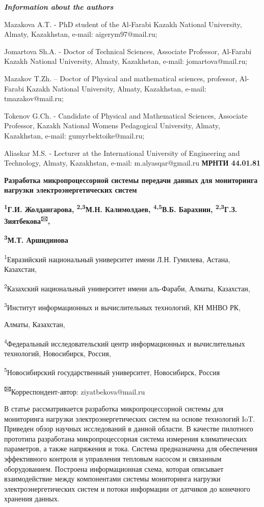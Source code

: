 \emph{{\bfseries Information about the authors}}

Mazakova A.T. - PhD student of the Al-Farabi Kazakh National University,
Almaty, Kazakhstan, e-mail: aigerym97@mail.ru;

Jomartova Sh.A. - Doctor of Technical Sciences, Associate Professor,
Al-Farabi Kazakh National University, Almaty, Kazakhstan, e-mail:
jomartova@mail.ru;

Mazakov T.Zh. -- Doctor of Physical and mathematical sciences,
professor, Al-Farabi Kazakh National University, Almaty, Kazakhstan,
e-mail: tmazakov@mail.ru;

Tokenov G.Ch. - Candidate of Physical and Mathematical Sciences,
Associate Professor, Kazakh National Women\textquotesingle s Pedagogical
University, Almaty, Kazakhstan, e-mail: gumyrbektoike@mail.ru;

Aliaskar M.S. - Lecturer at the International University of Engineering
and Technology, Almaty, Kazakhstan, e-mail: m.alyasqar@gmail.ru\newpage
{\bfseries МРНТИ 44.01.81}

{\bfseries Разработка микропроцессорной системы передачи данных для
мониторинга нагрузки электроэнергетических систем}

{\bfseries \textsuperscript{1}Г.И. Жолдангарова, \textsuperscript{2,3}М.Н.
Калимолдаев, \textsuperscript{4,5}В.Б. Барахнин,
\textsuperscript{2,3}Г.З. Зиятбекова\textsuperscript{🖂},}

{\bfseries \textsuperscript{3}М.Т. Аршидинова}

\textsuperscript{1}Евразийский национальный университет имени Л.Н.
Гумилева, Астана, Казахстан,

\textsuperscript{2}Казахский национальный университет имени аль-Фараби,
Алматы, Казахстан,

\textsuperscript{3}Институт информационных и вычислительных технологий,
КН МНВО РК,

Алматы, Казахстан,

\textsuperscript{4}Федеральный исследовательский центр информационных и
вычислительных технологий, Новосибирск, Россия,

\textsuperscript{5}Новосибирский государственный университет,
Новосибирск, Россия

{\bfseries \textsuperscript{🖂}}Корреспондент-автор: ziyatbekova@mail.ru

В статье рассматривается разработка микропроцессорной системы для
мониторинга нагрузки электроэнергетических систем на основе технологий
IoT. Приведен обзор научных исследований в данной области. В качестве
пилотного прототипа разработана микропроцессорная система измерения
климатических параметров, а также напряжения и тока. Система
предназначена для обеспечения эффективного контроля и управления
тепловым насосом и связанным оборудованием. Построена информационная
схема, которая описывает взаимодействие между компонентами системы
мониторинга нагрузки электроэнергетических систем и потоки информации от
датчиков до конечного хранения данных.

